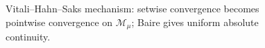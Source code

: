 \documentclass[a4paper]{article}
\begin{document}
\thispagestyle{empty}
\begin{figure}[H]
  \centering
  
  \caption{Vitali--Hahn--Saks mechanism: setwise convergence becomes pointwise convergence on $\mathcal{M}_\mu$; Baire gives uniform absolute continuity.}
\end{figure}
\end{document}

